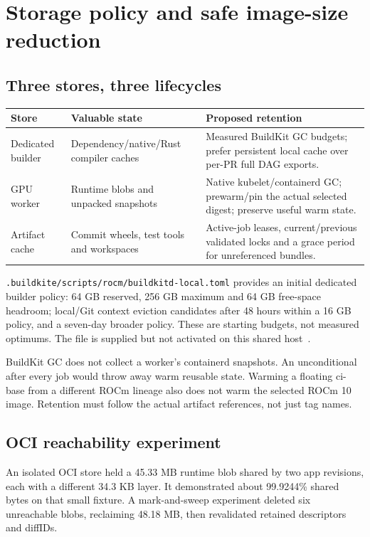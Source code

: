 \documentclass[11pt,a4paper]{article}
\newcommand{\file}[1]{\nolinkurl{#1}}
\newcommand{\term}[1]{\texttt{\detokenize{#1}}}
\begin{document}
\section{Storage policy and safe image-size reduction}

\subsection{Three stores, three lifecycles}

\begin{tabularx}{\textwidth}{L{38mm}XX}
\toprule
Store & Valuable state & Proposed retention \\
\midrule
Dedicated builder & Dependency/native/Rust compiler caches & Measured BuildKit
GC budgets; prefer persistent local cache over per-PR full DAG exports. \\
GPU worker & Runtime blobs and unpacked snapshots & Native kubelet/containerd
GC; prewarm/pin the actual selected digest; preserve useful warm state. \\
Artifact cache & Commit wheels, test tools and workspaces & Active-job leases,
current/previous validated locks and a grace period for unreferenced bundles. \\
\bottomrule
\end{tabularx}

\file{.buildkite/scripts/rocm/buildkitd-local.toml} provides an initial dedicated
builder policy: 64 GB reserved, 256 GB maximum and 64 GB free-space headroom;
local/Git context eviction candidates after 48 hours within a 16 GB policy, and
a seven-day broader policy. These are starting budgets, not measured optimums.
The file is supplied but not activated on this shared host~\cite{gc}.

BuildKit GC does not collect a worker's containerd snapshots. An unconditional
\term{docker system prune -a} after every job would throw away warm reusable
state. Warming a floating ci-base from a different ROCm lineage also does not
warm the selected ROCm 10 image. Retention must follow the actual artifact
references, not just tag names.

\subsection{OCI reachability experiment}

An isolated OCI store held a 45.33 MB runtime blob shared by two app revisions,
each with a different 34.3 KB layer. It demonstrated about 99.9244\% shared bytes
on that small fixture. A mark-and-sweep experiment deleted six unreachable blobs,
reclaiming 48.18 MB, then revalidated retained descriptors and diffIDs.
\end{document}
